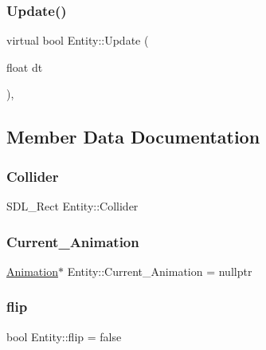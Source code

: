 \mbox{\label{class_entity_ae94191bd0a39541bc222f201d799e1c8}} 
\subsubsection{\texorpdfstring{Update()}{Update()}}
{\footnotesize\ttfamily virtual bool Entity\+::\+Update (\begin{DoxyParamCaption}\item[{float}]{dt }\end{DoxyParamCaption})\hspace{0.3cm}{\ttfamily [inline]}, {\ttfamily [virtual]}}



\subsection{Member Data Documentation}
\mbox{\label{class_entity_a329a2ad35048dfc5fb3ce88ae244a438}} 
\subsubsection{\texorpdfstring{Collider}{Collider}}
{\footnotesize\ttfamily S\+D\+L\+\_\+\+Rect Entity\+::\+Collider}

\mbox{\label{class_entity_a676763aaf9b176d5ff525451a7cbca64}} 
\subsubsection{\texorpdfstring{Current\_Animation}{Current\_Animation}}
{\footnotesize\ttfamily \mbox{\hyperlink{class_animation}{Animation}}$\ast$ Entity\+::\+Current\+\_\+\+Animation = nullptr}

\mbox{\label{class_entity_ac2dc5514ff9140af33939bc3056fb796}} 
\subsubsection{\texorpdfstring{flip}{flip}}
{\footnotesize\ttfamily bool Entity\+::flip = false}

